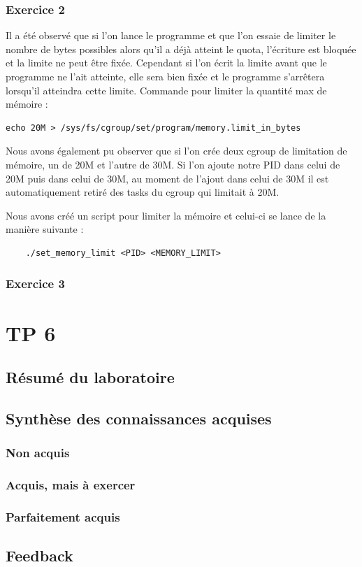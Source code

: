 \documentclass{ReportTemplate}
\begin{document}
\subsection{Exercice 2}
Il a été observé que si l'on lance le programme et que l'on essaie de limiter le
nombre de bytes possibles alors qu'il a déjà atteint le quota, l'écriture est
bloquée et la limite ne peut être fixée. Cependant si l'on écrit la limite avant
que le programme ne l'ait atteinte, elle sera bien fixée et le programme
s'arrêtera lorsqu'il atteindra cette limite.\newline
Commande pour limiter la quantité max de mémoire :
\begin{verbatim}
echo 20M > /sys/fs/cgroup/set/program/memory.limit_in_bytes
\end{verbatim}

Nous avons également pu observer que si l'on crée deux cgroup de limitation de
mémoire, un de 20M et l'autre de 30M. Si l'on ajoute notre PID dans celui de 20M
puis dans celui de 30M, au moment de l'ajout dans celui de 30M il est
automatiquement retiré des tasks du cgroup qui limitait à 20M.\newline

Nous avons créé un script pour limiter la mémoire et celui-ci se lance de la
manière suivante : 
\begin{verbatim}
    ./set_memory_limit <PID> <MEMORY_LIMIT>
\end{verbatim}

\subsection{Exercice 3}


\chapter{TP 6}
\section{Résumé du laboratoire}

\section{Synthèse des connaissances acquises}
\subsection{Non acquis}

\subsection{Acquis, mais à exercer}

\subsection{Parfaitement acquis}

\section{Feedback}
\end{document}
